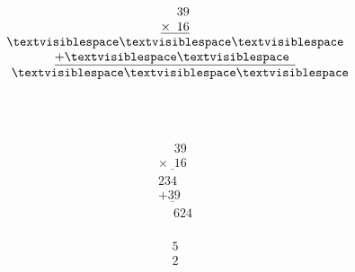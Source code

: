 \begin{minipage}[t]{0.3\linewidth}
\begin{align*}\begin{array}{c}
\phantom{
\times0
}
39\\
\underline{
\times
\phantom{
0
}
16
}\\
\textvisiblespace
\textvisiblespace
\textvisiblespace
\\
\underline{
+
\textvisiblespace
\textvisiblespace
\phantom0
}
\\
\phantom{+}
\textvisiblespace
\textvisiblespace
\textvisiblespace
\end{array}\end{align*}
\end{minipage}
\begin{minipage}[t]{0.05\linewidth}
\begin{align*}\begin{array}{c}
\textvisiblespace
\\
\textvisiblespace
\end{array}\end{align*}
\end{minipage}
\begin{minipage}[t]{0.3\linewidth}
\begin{align*}\begin{array}{c}
\phantom{
\times0
}
39\\
\underline{
\times
\phantom{
0
}
16
}\\
234
\\
\underline{
+
39
\phantom0
}
\\
\phantom{+}
624
\end{array}\end{align*}
\end{minipage}
\begin{minipage}[t]{0.05\linewidth}
\begin{align*}\begin{array}{c}
5
\\
2
\end{array}\end{align*}
\end{minipage}

